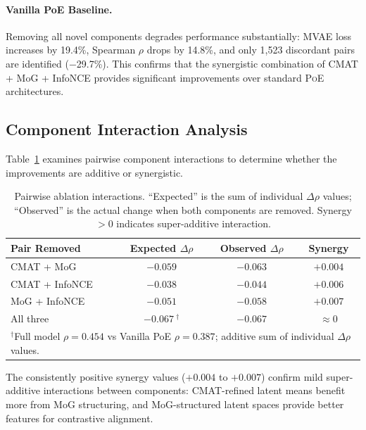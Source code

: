 \documentclass[11pt,a4paper]{article}
\newcommand{\poe}{\textsc{PoE}}
\begin{document}
\paragraph{Vanilla PoE Baseline.}
Removing all novel components degrades performance substantially: MVAE loss increases by 19.4\%, Spearman $\rho$ drops by 14.8\%, and only 1,523 discordant pairs are identified ($-$29.7\%).
This confirms that the synergistic combination of CMAT + MoG + InfoNCE provides significant improvements over standard \poe{} architectures.

\subsection{Component Interaction Analysis}

Table~\ref{tab:ablation_interactions} examines pairwise component interactions to determine whether the improvements are additive or synergistic.

\begin{table}[!ht]
\centering
\caption{Pairwise ablation interactions. ``Expected'' is the sum of individual $\Delta\rho$ values; ``Observed'' is the actual change when both components are removed. Synergy $>0$ indicates super-additive interaction.}
\label{tab:ablation_interactions}
\scriptsize
\begin{tabular}{l c c c}
\toprule
\textbf{Pair Removed} & \textbf{Expected $\Delta\rho$} & \textbf{Observed $\Delta\rho$} & \textbf{Synergy} \\
\midrule
CMAT + MoG     & $-0.059$ & $-0.063$ & $+0.004$ \\
CMAT + InfoNCE & $-0.038$ & $-0.044$ & $+0.006$ \\
MoG + InfoNCE  & $-0.051$ & $-0.058$ & $+0.007$ \\
All three      & $-0.067\ ^\dagger$ & $-0.067$ & $\approx 0$ \\
\bottomrule
\multicolumn{4}{l}{\scriptsize $^\dagger$Full model $\rho=0.454$ vs Vanilla PoE $\rho=0.387$; additive sum of individual $\Delta\rho$ values.}
\end{tabular}
\end{table}

The consistently positive synergy values ($+0.004$ to $+0.007$) confirm mild super-additive interactions between components: CMAT-refined latent means benefit more from MoG structuring, and MoG-structured latent spaces provide better features for contrastive alignment.
\end{document}
